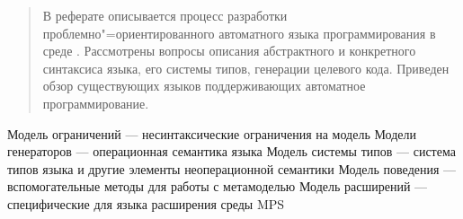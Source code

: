 \documentclass[a4paper,12pt]{article}
\begin{document}

\begin{abstract}
В реферате описывается процесс разработки проблемно"=ориентированного автоматного языка программирования в среде \MPS{}. Рассмотрены вопросы описания абстрактного и конкретного синтаксиса языка, его системы типов, генерации целевого кода. Приведен обзор существующих языков поддерживающих автоматное программирование.
\end{abstract}

\tableofcontents












\TBD Модель ограничений — несинтаксические ограничения на модель
\TBD Модели генераторов — операционная семантика языка
\TBD Модель системы типов — система типов языка и другие элементы неоперационной семантики
\TBD Модель поведения — вспомогательные методы для работы с метамоделью
\TBD Модель расширений — специфические для языка расширения среды MPS


\end{document}
